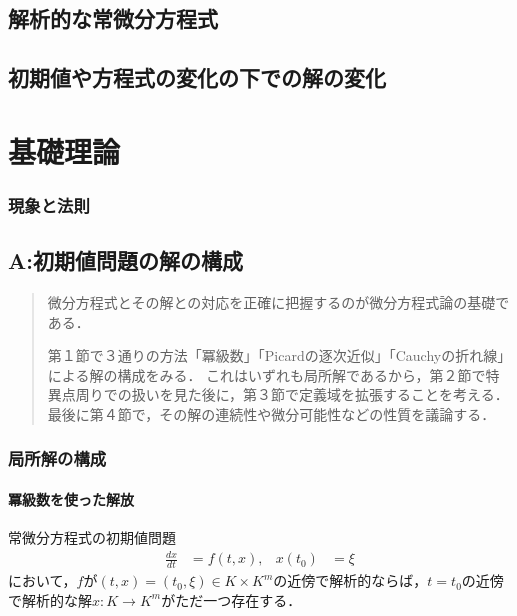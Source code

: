 \documentclass[uplatex,dvipdfmx]{jsreport}
\begin{document}
\chapter{解析的な常微分方程式}

\chapter{初期値や方程式の変化の下での解の変化}

\part{基礎理論}

\section{現象と法則}


\chapter{A:初期値問題の解の構成}

\begin{quotation}
    微分方程式とその解との対応を正確に把握するのが微分方程式論の基礎である．

    第１節で３通りの方法「冪級数」「Picardの逐次近似」「Cauchyの折れ線」による解の構成をみる．
    これはいずれも局所解であるから，第２節で特異点周りでの扱いを見た後に，第３節で定義域を拡張することを考える．
    最後に第４節で，その解の連続性や微分可能性などの性質を議論する．
\end{quotation}


\section{局所解の構成}

\subsection{冪級数を使った解放}

\begin{theorem}[Cauchy]
    常微分方程式の初期値問題
    \begin{align*}
        \frac{dx}{dt}&=f(t,x), & x(t_0)&=\xi
    \end{align*}
    において，$f$が$(t,x)=(t_0,\xi)\in K\times K^m$の近傍で解析的ならば，$t=t_0$の近傍で解析的な解$x:K\to K^m$がただ一つ存在する．
\end{theorem}
\end{document}
